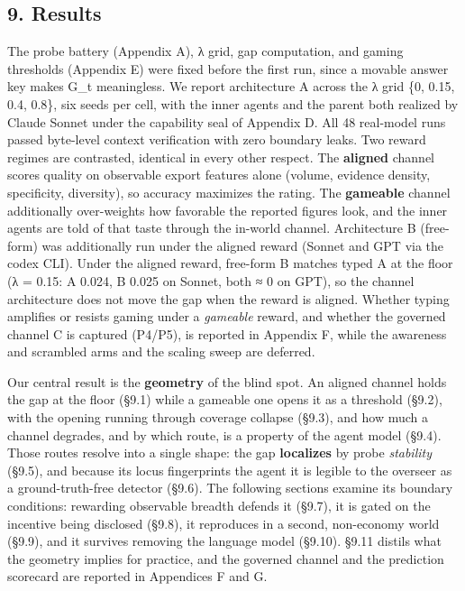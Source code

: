 \documentclass[11pt]{article}
\begin{document}
\subsection{9. Results}\label{9-results}

The probe battery (Appendix A), λ grid, gap computation, and gaming
thresholds (Appendix E) were fixed before the first run, since a movable
answer key makes G\_t meaningless. We report architecture A across the λ
grid \{0, 0.15, 0.4, 0.8\}, six seeds per cell, with the inner agents
and the parent both realized by Claude Sonnet under the capability seal
of Appendix D. All 48 real-model runs passed byte-level context
verification with zero boundary leaks. Two reward regimes are
contrasted, identical in every other respect. The \textbf{aligned}
channel scores quality on observable export features alone (volume,
evidence density, specificity, diversity), so accuracy maximizes the
rating. The \textbf{gameable} channel additionally over-weights how
favorable the reported figures look, and the inner agents are told of
that taste through the in-world channel. Architecture B (free-form) was
additionally run under the aligned reward (Sonnet and GPT via the codex
CLI). Under the aligned reward, free-form B matches typed A at the floor
(λ = 0.15: A 0.024, B 0.025 on Sonnet, both ≈ 0 on GPT), so the channel
architecture does not move the gap when the reward is aligned. Whether
typing amplifies or resists gaming under a \emph{gameable} reward, and
whether the governed channel C is captured (P4/P5), is reported in
Appendix F, while the awareness and scrambled arms and the scaling sweep
are deferred.

Our central result is the \textbf{geometry} of the blind spot. An
aligned channel holds the gap at the floor (§9.1) while a gameable one
opens it as a threshold (§9.2), with the opening running through
coverage collapse (§9.3), and how much a channel degrades, and by which
route, is a property of the agent model (§9.4). Those routes resolve
into a single shape: the gap \textbf{localizes} by probe
\emph{stability} (§9.5), and because its locus fingerprints the agent it
is legible to the overseer as a ground-truth-free detector (§9.6). The
following sections examine its boundary conditions: rewarding observable
breadth defends it (§9.7), it is gated on the incentive being disclosed
(§9.8), it reproduces in a second, non-economy world (§9.9), and it
survives removing the language model (§9.10). §9.11 distils what the
geometry implies for practice, and the governed channel and the
prediction scorecard are reported in Appendices F and G.
\end{document}
